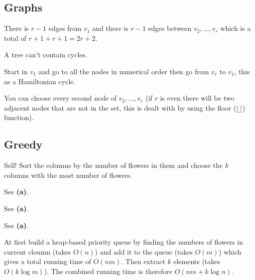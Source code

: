 \documentclass[a4paper]{article}
\newenvironment{task}[1]
{
	\begin{description}[align=right]
		\item [#1]
}{		%
	\end{description}
}
\newcommand{\taskref}[1]{\textbf{#1}}
\DeclareMathOperator{\*}{\cdot}
\begin{document}
\subsection*{Graphs}

\begin{task}{5. (a)}
\end{task}

\begin{task}{(b)}
	 There is $r-1$ edges from $v_1$ and there is $r-1$ edges between $v_2,\ldots,v_r$ which is a total of $r+1+r+1=2r+2$.
\end{task}

\begin{task}{(c)}
	 A tree can't contain cycles.
\end{task}

\begin{task}{(d)}
	 Start in $v_1$ and go to all the nodes in numerical order then go from $v_r$ to $v_1$, this as a Hamiltonian cycle.
\end{task}

\begin{task}{(e)}
	 You can choose every second node of $v_2,\ldots,v_r$ (if $r$ is even there will be two adjacent nodes that are not in the set, this is dealt with by using the floor ($\lfloor \rfloor$) function). 
\end{task}

\subsection*{Greedy}

\begin{task}{6. (a)}
	 Sell! Sort the columns by the number of flowers in them and choose the $k$ columns with the most number of flowers. 
\end{task}

\begin{task}{(b)}
	 See \taskref{(a)}.
\end{task}

\begin{task}{(c)}
	 See \taskref{(a)}.
\end{task}

\begin{task}{(d)}
	 See \taskref{(a)}.
\end{task}

\begin{task}{(e)}
	 At first build a heap-based priority queue by finding the numbers of flowers in current cloumn (takes $O(n)$) and add it to the queue (takes $O(m)$) which gives a total running time of $O(nm)$. Then extract $k$ elements (takes $O(k\log m)$). The combined running time is therefore $O(nm+k\log n)$.
\end{task}
\end{document}
